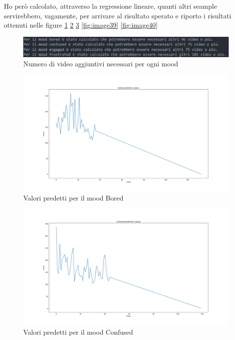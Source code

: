 Ho però calcolato, attraverso 
la regressione lineare, quanti altri seample servirebbero, vagamente, per arrivare al 
risultato sperato e riporto i risultati ottenuti nelle figure \ref{fig:image36} \ref{fig:image37} \ref{fig:image38} \ref{fig:image39} \ref{fig:image40} 
\begin{figure}
    \begin{center}    
        \includegraphics[width=1\linewidth]{images/passaggi aggiuntivi.png}
        \caption{Numero di video aggiuntivi necessari per ogni mood}
        \label{fig:image36}
    \end{center}
\end{figure}
\begin{figure}
    \begin{center}    
        \includegraphics[width=1\linewidth]{images/bored prediction values.png}
        \caption{Valori predetti per il mood Bored}
        \label{fig:image37}
    \end{center}
\end{figure}
\begin{figure}
    \begin{center}    
        \includegraphics[width=1\linewidth]{images/confused prediction values.png}
        \caption{Valori predetti per il mood Confused}
        \label{fig:image38}
    \end{center}
\end{figure}\clearpage
